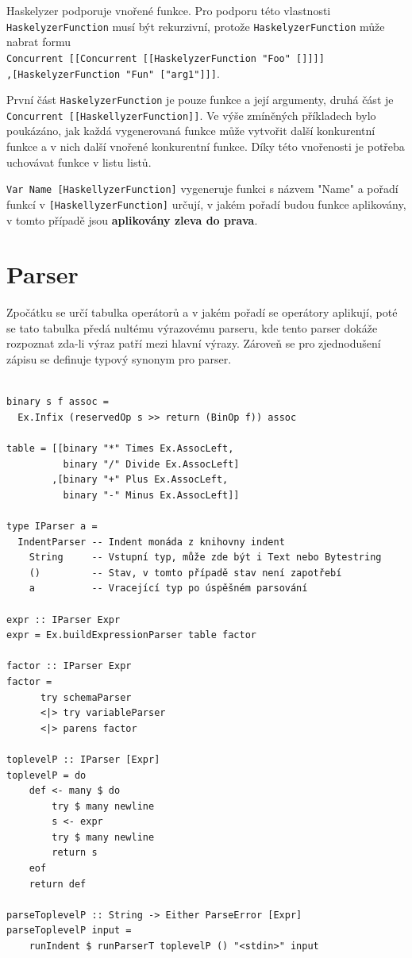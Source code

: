 \documentclass[male,czech]{kithesis}
\newcommand{\haskellInline}[1]{\colorbox{gray!10}{\texttt{#1}}}
\begin{document}
Haskelyzer podporuje vnořené funkce. 
Pro podporu této vlastnosti \haskellInline{HaskelyzerFunction} musí být rekurzivní, 
protože \haskellInline{HaskelyzerFunction} může nabrat formu 
\\
\haskellInline{Concurrent [[Concurrent [[HaskelyzerFunction "Foo" []]]]}
\\
\haskellInline{,[HaskelyzerFunction "Fun" ["arg1"]]]}.

První část \haskellInline{HaskelyzerFunction} je pouze funkce a 
její argumenty, 
druhá část je \haskellInline{Concurrent [[HaskellyzerFunction]]}.
Ve výše zmíněných příkladech bylo poukázáno, 
jak každá vygenerovaná funkce může vytvořit 
další konkurentní funkce a v nich další vnořené konkurentní funkce. 
Díky této vnořenosti 
je potřeba uchovávat funkce v listu listů.

\haskellInline{Var Name [HaskellyzerFunction]} vygeneruje funkci s názvem "Name" a 
pořadí funkcí v \haskellInline{[HaskellyzerFunction]} určují, 
v jakém pořadí budou funkce aplikovány,
v tomto případě jsou \textbf{aplikovány zleva do prava}.

\section{Parser}

Zpočátku se určí tabulka operátorů a 
v jakém pořadí se operátory aplikují, 
poté se tato tabulka předá nultému výrazovému parseru, 
kde tento parser dokáže rozpoznat zda-li výraz patří mezi
hlavní výrazy. 
Zároveň se pro zjednodušení zápisu se definuje typový 
synonym pro parser.

\begin{verbatim}

binary s f assoc = 
  Ex.Infix (reservedOp s >> return (BinOp f)) assoc

table = [[binary "*" Times Ex.AssocLeft,
          binary "/" Divide Ex.AssocLeft]
        ,[binary "+" Plus Ex.AssocLeft,
          binary "-" Minus Ex.AssocLeft]]

type IParser a = 
  IndentParser -- Indent monáda z knihovny indent
    String     -- Vstupní typ, může zde být i Text nebo Bytestring
    ()         -- Stav, v tomto případě stav není zapotřebí
    a          -- Vracející typ po úspěšném parsování

expr :: IParser Expr
expr = Ex.buildExpressionParser table factor

factor :: IParser Expr
factor = 
      try schemaParser 
      <|> try variableParser
      <|> parens factor 

toplevelP :: IParser [Expr]
toplevelP = do 
    def <- many $ do 
        try $ many newline
        s <- expr 
        try $ many newline
        return s
    eof
    return def

parseToplevelP :: String -> Either ParseError [Expr]
parseToplevelP input = 
    runIndent $ runParserT toplevelP () "<stdin>" input

\end{verbatim}
\end{document}
